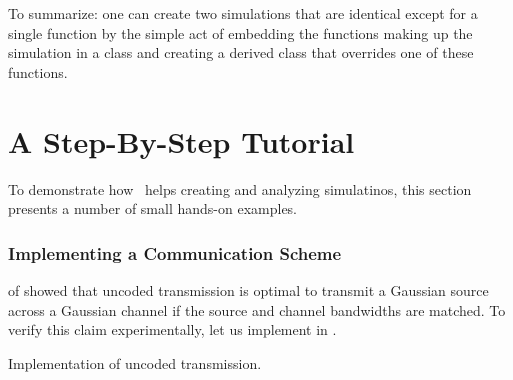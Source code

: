 To summarize: one can create two simulations that are identical except for a
single function by the simple act of embedding the functions making up the
simulation in a class and creating a derived class that overrides one of these
functions.


\section{A Step-By-Step Tutorial}

To demonstrate how \jscsim\ helps creating and analyzing simulatinos, this
section presents a number of small hands-on examples.


\subsubsection{Implementing a Communication Scheme}

 of  showed that uncoded transmission is
optimal to transmit a Gaussian source across a Gaussian channel if the source
and channel bandwidths are matched. To verify this claim experimentally, let us
implement  in \jscsim. 

\begin{listing}
  \caption{Implementation of uncoded transmission.}
  \label{lst:uncoded}
\end{listing}

